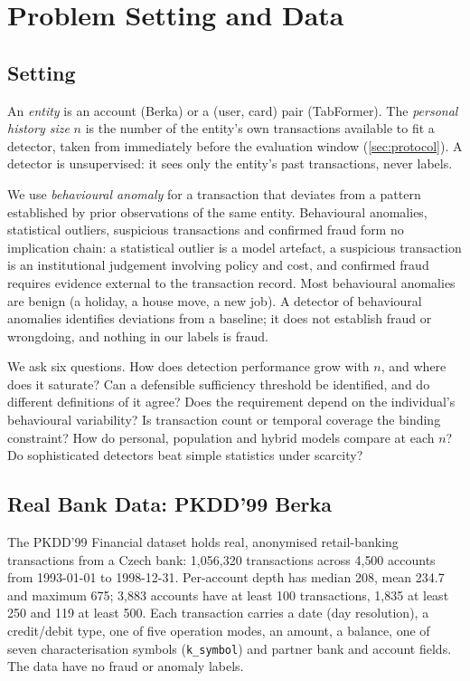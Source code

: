 \section{Problem Setting and Data}\label{sec:setting}

\subsection{Setting}
An \emph{entity} is an account (Berka) or a (user, card) pair (TabFormer). The \emph{personal history size} $n$ is the number of the entity's own transactions available to fit a detector, taken from immediately before the evaluation window (\cref{sec:protocol}). A detector is unsupervised: it sees only the entity's past transactions, never labels.

We use \emph{behavioural anomaly} for a transaction that deviates from a pattern established by prior observations of the same entity. Behavioural anomalies, statistical outliers, suspicious transactions and confirmed fraud form no implication chain: a statistical outlier is a model artefact, a suspicious transaction is an institutional judgement involving policy and cost, and confirmed fraud requires evidence external to the transaction record. Most behavioural anomalies are benign (a holiday, a house move, a new job). A detector of behavioural anomalies identifies deviations from a baseline; it does not establish fraud or wrongdoing, and nothing in our labels is fraud.

We ask six questions. How does detection performance grow with $n$, and where does it saturate? Can a defensible sufficiency threshold be identified, and do different definitions of it agree? Does the requirement depend on the individual's behavioural variability? Is transaction count or temporal coverage the binding constraint? How do personal, population and hybrid models compare at each $n$? Do sophisticated detectors beat simple statistics under scarcity?

\subsection{Real Bank Data: PKDD'99 Berka}
The PKDD'99 Financial dataset \cite{berka1999pkdd} holds real, anonymised retail-banking transactions from a Czech bank: 1{,}056{,}320 transactions across 4{,}500 accounts from 1993-01-01 to 1998-12-31. Per-account depth has median 208, mean 234.7 and maximum 675; 3{,}883 accounts have at least 100 transactions, 1{,}835 at least 250 and 119 at least 500. Each transaction carries a date (day resolution), a credit/debit type, one of five operation modes, an amount, a balance, one of seven characterisation symbols (\texttt{k\_symbol}) and partner bank and account fields. The data have no fraud or anomaly labels.

